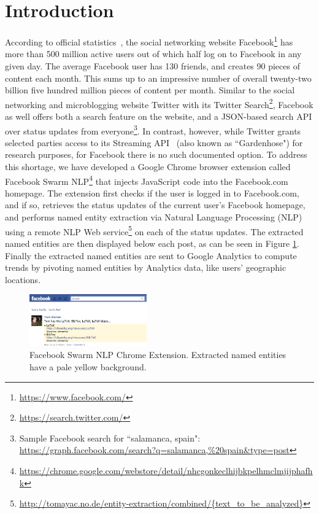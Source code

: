 \documentclass[conference]{IEEEtran}
\begin{document}
\section{Introduction}                                                      \label{sec:introduction}
According to official statistics~\cite{Facebook}, the social networking website Facebook\footnote{\url{https://www.facebook.com/}} has more than 500 million active users out of which half log on to Facebook in any given day. The average Facebook user has 130 friends, and creates 90 pieces of content each month. This sums up to an impressive number of overall twenty-two billion five hundred million pieces of content per month. Similar to the social networking and microblogging website Twitter with its Twitter Search\footnote{\url{https://search.twitter.com/}}, Facebook as well offers both a search feature on the website, and a JSON-based search API over status updates from everyone\footnote{Sample Facebook search for ``salamanca, spain": \url{https://graph.facebook.com/search?q=salamanca,\%20spain&type=post}}. In contrast, however, while Twitter grants selected parties access to its Streaming API~\cite{Twitter} (also known as ``Gardenhose") for research purposes, for Facebook there is no such documented option. To address this shortage, we have developed a Google Chrome browser extension called Facebook Swarm NLP\footnote{\url{https://chrome.google.com/webstore/detail/nhcgonkeclhijbkpelhmclmjijphafhk}} that injects JavaScript code into the Facebook.com homepage. The extension first checks if the user is logged in to Facebook.com, and if so, retrieves the status updates of the current user's Facebook homepage, and performs named entity extraction via Natural Language Processing (NLP) using a remote NLP Web service\footnote{\url{http://tomayac.no.de/entity-extraction/combined/{text_to_be_analyzed}}} on each of the status updates. The extracted named entities are then displayed below each post, as can be seen in Figure \ref{fig:facebook}. Finally the extracted named entities are sent to Google Analytics to compute trends by pivoting named entities by Analytics data, like users' geographic locations.

\begin{figure}[htb!]
  \centering
    \includegraphics[width=0.45\textwidth]{facebook-swarm-nlp.png}
  \caption{Facebook Swarm NLP Chrome Extension. Extracted named entities have a pale yellow background.}     
  \label{fig:facebook}
\end{figure}
\end{document}
